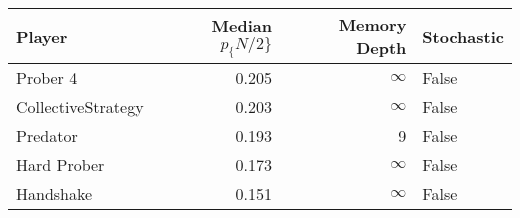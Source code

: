 \begin{tabular}{lrrl}
\toprule
             Player &  Median $p_\{N/2\}$ &  Memory Depth & Stochastic \\
\midrule
           Prober 4 &             0.205 &            \(\infty\) &      False \\
 CollectiveStrategy &             0.203 &            \(\infty\) &      False \\
           Predator &             0.193 &             9 &      False \\
        Hard Prober &             0.173 &            \(\infty\) &      False \\
          Handshake &             0.151 &            \(\infty\) &      False \\
\bottomrule
\end{tabular}
